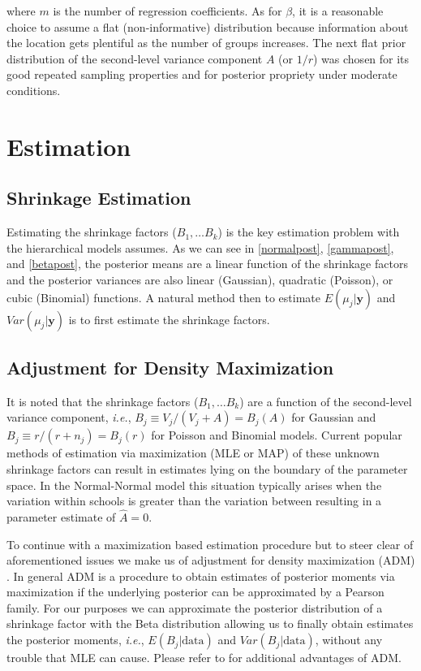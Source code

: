 \documentclass[article]{jss}
\begin{document}
where $m$ is the number of regression coefficients. As for $\beta$, it is a reasonable choice to assume a flat (non-informative) distribution because information about the location gets plentiful as the number of groups increases. The next flat prior distribution of the second-level variance component $A$ (or $1/r$) was chosen for its good repeated sampling properties and for posterior propriety under moderate conditions.


\section[Estimation]{Estimation}

\subsection[Shrinkage Estimation]{Shrinkage Estimation}
Estimating the shrinkage factors ($B_1, \ldots B_k$) is the key estimation problem with the hierarchical models  assumes. As we can see in \ref{normalpost}, \ref{gammapost}, and \ref{betapost}, the posterior means are a linear function of the shrinkage factors and the posterior variances are also linear (Gaussian), quadratic (Poisson), or cubic (Binomial) functions. A natural method then to estimate $E(\mu_{j}\vert \textbf{y})$ and $Var(\mu_{j}\vert \textbf{y})$ is to first estimate the shrinkage factors.

\subsection[ADM]{Adjustment for Density Maximization}
It is noted that the shrinkage factors ($B_1, \ldots B_k$) are a function of the second-level variance component, \emph{i.e.}, $B_{j}\equiv V_{j}/(V_{j}+A)=B_{j}(A)$ for Gaussian and $B_{j}\equiv r/(r+n_{j})=B_{j}(r)$ for Poisson and Binomial models. Current popular methods of estimation via maximization (MLE or MAP) of these unknown shrinkage factors can result in estimates lying on the boundary of the parameter space. In the Normal-Normal model this situation typically arises when the variation within schools is greater than the variation between resulting in a parameter estimate of $\hat{A} = 0$. %

To continue with a maximization based estimation procedure but to steer clear of aforementioned issues we make us of adjustment for density maximization (ADM) \cite{2011}. In general ADM is a procedure to obtain estimates of posterior moments via maximization if the underlying posterior can be approximated by a Pearson family. For our purposes we can approximate the posterior distribution of a shrinkage factor with the Beta distribution allowing us to finally obtain estimates the posterior moments, \emph{i.e.}, $E(B_{j}\vert\textrm{data})$ and $Var(B_{j}\vert\textrm{data})$, without any trouble that MLE can cause. Please refer to \cite{2011} for additional advantages of ADM.
\end{document}
